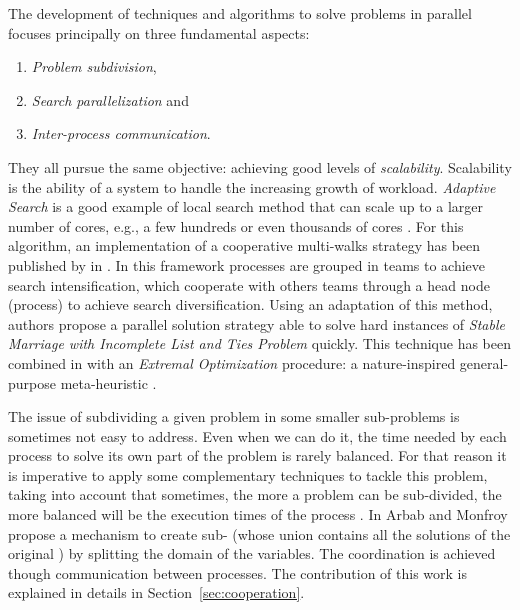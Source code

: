 The development of techniques and algorithms to solve problems in parallel focuses principally on three fundamental aspects: 
\begin{enumerate}%
    \item {\it Problem subdivision},
    \item {\it Search parallelization} and %
    \item {\it Inter-process communication}.
\end{enumerate}%
They all pursue the same objective: achieving good levels of \textit{scalability}. Scalability is the ability of a system to handle the increasing growth of workload. 
\textit{Adaptive Search} is a good example of local search method that can scale up to a larger number of cores, e.g., a few hundreds or even thousands of cores \cite{Diaz}. For this algorithm, an implementation of a cooperative multi-walks strategy has been published by  in \cite{Munera}. In this framework processes are grouped in teams to achieve search intensification, which cooperate with others teams through a head node (process) to achieve search diversification. Using an adaptation of this method, authors propose a parallel solution strategy able to solve hard instances of \textit{Stable Marriage with Incomplete List and Ties Problem} quickly. This technique has been combined in \cite{Munera2016} with an \textit{Extremal Optimization} procedure: a nature-inspired general-purpose meta-heuristic \cite{Boettcher2000}.
	
The issue of subdividing a given problem in some smaller sub-problems is sometimes not easy to address. Even when we can do it, the time needed by each process to solve its own part of the problem is rarely balanced. For that reason it is imperative to apply some complementary techniques to tackle this problem, taking into account that sometimes, the more a problem can be sub-divided, the more balanced will be the execution times of the process \cite{Hill}.%
In \cite{Arbab2000} Arbab and Monfroy propose a mechanism to create sub-\csps{} (whose union contains all the solutions of the original \csp) by splitting the domain of the variables. The coordination is achieved though communication between processes. The contribution of this work is explained in details in Section~\ref{sec:cooperation}. 

